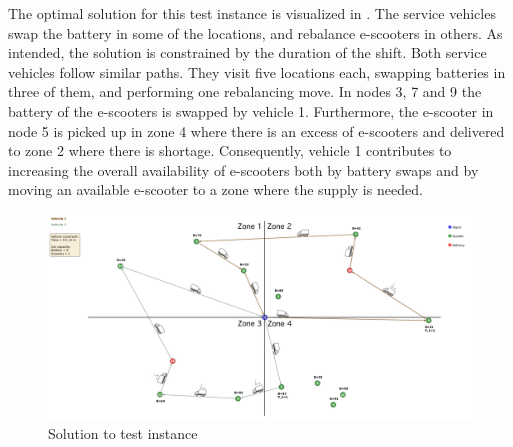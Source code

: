 The optimal solution for this test instance is visualized in . The service vehicles swap the battery in some of the locations, and rebalance e-scooters in others. As intended, the solution is constrained by the duration of the shift. Both service vehicles follow similar paths. They visit five locations each, swapping batteries in three of them, and performing one rebalancing move. In nodes 3, 7 and 9 the battery of the e-scooters is swapped by vehicle 1. Furthermore, the e-scooter in node  5 is picked up in zone 4 where there is an excess of e-scooters and delivered to zone 2 where there is shortage. Consequently, vehicle 1 contributes to increasing the overall availability of e-scooters both by battery swaps and by moving an available e-scooter to a zone where the supply is needed.
\\
\begin{figure}[H]
    \hspace*{-1.7cm}
    \includegraphics[width=18cm]{Images/example_solution.png}
    \caption{Solution to test instance}
    \label{fig:example_solution}
\end{figure}

